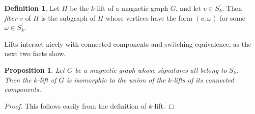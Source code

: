 \documentclass[12pt]{article}
\newtheorem{prop}[thm]{Proposition}
\theoremstyle{definition}
\newtheorem{defn}[thm]{Definition}
\begin{document}
\begin{defn}
Let $H$ be the $k$-lift of a magnetic graph $G$, and let $v \in S^\prime_k$. Then \textit{fiber $v$} of $H$ is the subgraph of $H$ whose vertices have the form $(v, \omega)$ for some $\omega \in S^\prime_k$. 
\end{defn}

Lifts interact nicely with connected components and switching equivalence, as the next two facts show.

\begin{prop}\label{lifts of connected components}
Let $G$ be a magnetic graph whose signatures all belong to $S^\prime_k$. Then the \textit{$k$-lift} of $G$ is isomorphic to the union of the $k$-lifts of its connected components.
\end{prop}
\begin{proof}
This follows easily from the definition of $k$-lift.
\end{proof}
\end{document}
